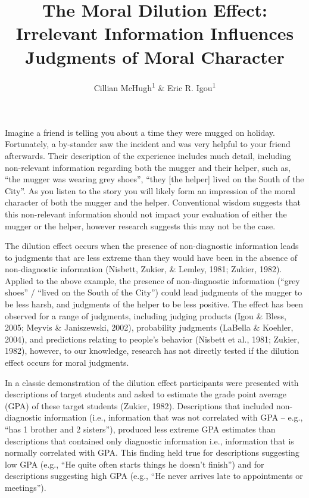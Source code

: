 \documentclass[
  man,floatsintext]{apa7}
\title{The Moral Dilution Effect: Irrelevant Information Influences Judgments of Moral Character}
\author{Cillian McHugh\textsuperscript{1} \& Eric R. Igou\textsuperscript{1}}
\date{}
\affiliation{\vspace{0.5cm}\textsuperscript{1} University of Limerick}
\begin{document}
\maketitle

Imagine a friend is telling you about a time they were mugged on holiday. Fortunately, a by-stander saw the incident and was very helpful to your friend afterwards. Their description of the experience includes much detail, including non-relevant information regarding both the mugger and their helper, such as, ``the mugger was wearing grey shoes'', ``they {[}the helper{]} lived on the South of the City''. As you listen to the story you will likely form an impression of the moral character of both the mugger and the helper. Conventional wisdom suggests that this non-relevant information should not impact your evaluation of either the mugger or the helper, however research suggests this may not be the case.

The dilution effect occurs when the presence of non-diagnostic information leads to judgments that are less extreme than they would have been in the absence of non-diagnostic information (Nisbett, Zukier, \& Lemley, 1981; Zukier, 1982). Applied to the above example, the presence of non-diagnostic information (``grey shoes'' / ``lived on the South of the City'') could lead judgments of the mugger to be less harsh, and judgments of the helper to be less positive. The effect has been observed for a range of judgments, including judging products (Igou \& Bless, 2005; Meyvis \& Janiszewski, 2002), probability judgments (LaBella \& Koehler, 2004), and predictions relating to people's behavior (Nisbett et al., 1981; Zukier, 1982), however, to our knowledge, research has not directly tested if the dilution effect occurs for moral judgments.

In a classic demonstration of the dilution effect participants were presented with descriptions of target students and asked to estimate the grade point average (GPA) of these target students (Zukier, 1982). Descriptions that included non-diagnostic information (i.e., information that was not correlated with GPA -- e.g., ``has 1 brother and 2 sisters''), produced less extreme GPA estimates than descriptions that contained only diagnostic information i.e., information that is normally correlated with GPA. This finding held true for descriptions suggesting low GPA (e.g., ``He quite often starts things he doesn't finish'') and for descriptions suggesting high GPA (e.g., ``He never arrives late to appointments or meetings'').
\end{document}

